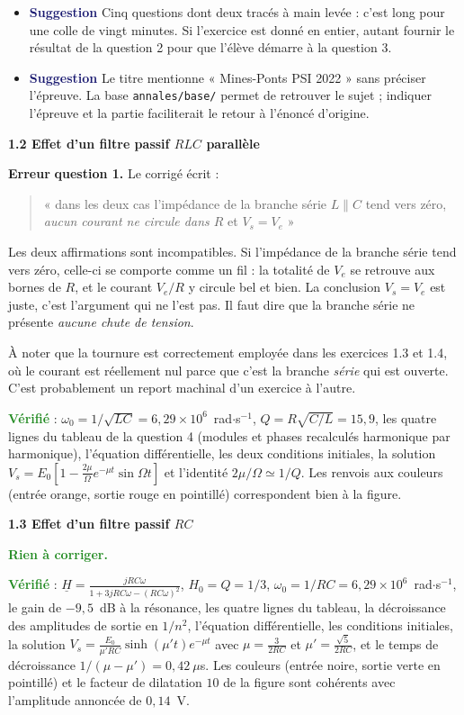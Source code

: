 \documentclass[a4paper,11pt]{article}
\newcommand{\exo}[1]{\vspace{0.7\baselineskip}\noindent\textbf{\large #1}\par\nopagebreak\vspace{0.2\baselineskip}}
\newcommand{\erreur}{\textcolor{BrickRed}{\textbf{Erreur}}}
\newcommand{\suggestion}{\textcolor{MidnightBlue}{\textbf{Suggestion}}}
\newcommand{\verifie}{\textcolor{ForestGreen}{\textbf{Vérifié}}}
\newcommand{\rien}{\textcolor{ForestGreen}{\textbf{Rien à corriger.}}}
\begin{document}
\begin{itemize}
	\item \suggestion{} Cinq questions dont deux tracés à main levée : c'est long pour une colle de
	vingt minutes. Si l'exercice est donné en entier, autant fournir le résultat de la question 2 pour
	que l'élève démarre à la question 3.
	\item \suggestion{} Le titre mentionne « Mines-Ponts PSI 2022 » sans préciser l'épreuve. La base
	\texttt{annales/base/} permet de retrouver le sujet ; indiquer l'épreuve et la partie faciliterait
	le retour à l'énoncé d'origine.
\end{itemize}

\exo{1.2 Effet d'un filtre passif $RLC$ parallèle}

\erreur{} \textbf{question 1.} Le corrigé écrit :

\begin{quote}
« dans les deux cas l'impédance de la branche série $L\parallel C$ tend vers zéro, \textit{aucun
courant ne circule dans $R$} et $V_s = V_e$ »
\end{quote}

Les deux affirmations sont incompatibles. Si l'impédance de la branche série tend vers zéro, celle-ci
se comporte comme un fil : la totalité de $V_e$ se retrouve aux bornes de $R$, et le courant $V_e/R$
y circule bel et bien. La conclusion $V_s=V_e$ est juste, c'est l'argument qui ne l'est pas. Il faut
dire que la branche série ne présente \textit{aucune chute de tension}.

À noter que la tournure est correctement employée dans les exercices 1.3 et 1.4, où le courant est
réellement nul parce que c'est la branche \textit{série} qui est ouverte. C'est probablement un
report machinal d'un exercice à l'autre.

\medskip
\verifie{} : $\omega_0=1/\sqrt{LC}=6{,}29\times10^{6}$~rad$\cdot$s$^{-1}$, $Q=R\sqrt{C/L}=15{,}9$,
les quatre lignes du tableau de la question 4 (modules et phases recalculés harmonique par
harmonique), l'équation différentielle, les deux conditions initiales, la solution
$V_s=E_0\left[1-\frac{2\mu}{\Omega}e^{-\mu t}\sin\Omega t\right]$ et l'identité $2\mu/\Omega\simeq1/Q$.
Les renvois aux couleurs (entrée orange, sortie rouge en pointillé) correspondent bien à la figure.

\exo{1.3 Effet d'un filtre passif $RC$}

\rien{}

\verifie{} : $\underline{H}=\frac{jRC\omega}{1+3jRC\omega-(RC\omega)^2}$, $H_0=Q=1/3$,
$\omega_0=1/RC=6{,}29\times10^{6}$~rad$\cdot$s$^{-1}$, le gain de $-9{,}5$~dB à la résonance, les
quatre lignes du tableau, la décroissance des amplitudes de sortie en $1/n^2$, l'équation
différentielle, les conditions initiales, la solution $V_s=\frac{E_0}{\mu'RC}\sinh(\mu't)e^{-\mu t}$
avec $\mu=\frac{3}{2RC}$ et $\mu'=\frac{\sqrt5}{2RC}$, et le temps de décroissance
$1/(\mu-\mu')=0{,}42~\mu$s. Les couleurs (entrée noire, sortie verte en pointillé) et le facteur de
dilatation $10$ de la figure sont cohérents avec l'amplitude annoncée de $0{,}14$~V.
\end{document}
